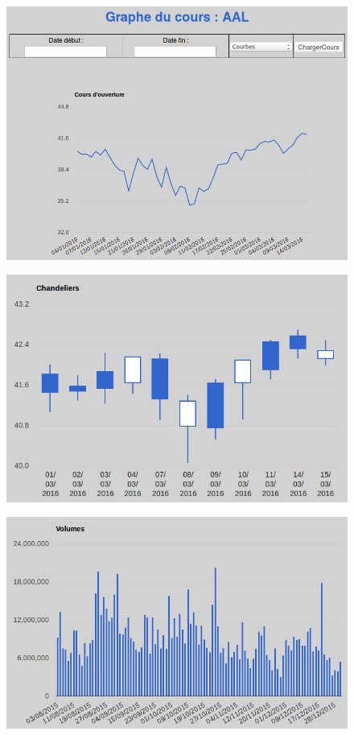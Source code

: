 \begin{enumerate}
\begin{figure}[H]
	\includegraphics[scale=0.5]{../graph/6-historiquecourbe.png}
      \end{figure}
      \begin{figure}[H]
	\center
	\includegraphics[scale=0.5]{../graph/6-historiquechandeliers.png}
      \end{figure}
      \begin{figure}[H]
	\center
	\includegraphics[scale=0.5]{../graph/6-historiquevolumes.png}

\end{figure}
\end{enumerate}
